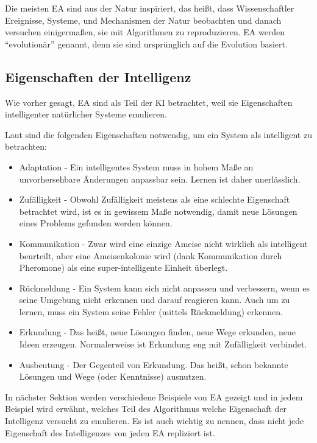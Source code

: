 \documentclass[twoside,twocolumn]{article}
\begin{document}
Die meisten EA sind aus der Natur inspiriert, das heißt, dass Wissenschaftler Ereignisse, Systeme, und Mechanismen der Natur beobachten und danach versuchen einigermaßen, sie mit Algorithmen zu reproduzieren. EA werden \enquote{evolutionär} genannt, denn sie sind ursprünglich auf die Evolution basiert. \cite{holland_ga}

\subsection{Eigenschaften der Intelligenz}
Wie vorher gesagt, EA sind als Teil der KI betrachtet, weil sie Eigenschaften intelligenter natürlicher Systeme emulieren.\par
Laut \cite{wiley_evolutionary} sind die folgenden Eigenschaften notwendig, um ein System als intelligent zu betrachten:

\begin{itemize}
\item{Adaptation - Ein intelligentes System muss in hohem Maße an unvorhersehbare Änderungen anpassbar sein. Lernen ist daher unerlässlich.}
\item{Zufälligkeit - Obwohl Zufälligkeit meistens als eine schlechte Eigenschaft betrachtet wird, ist es in gewissem Maße notwendig, damit neue Lösungen eines Problems gefunden werden können.}
\item{Kommunikation -  Zwar wird eine einzige Ameise nicht wirklich als intelligent beurteilt, aber eine Ameisenkolonie wird (dank Kommunikation durch Pheromone) als eine super-intelligente Einheit überlegt.}
\item{Rückmeldung - Ein System kann sich nicht anpassen und verbessern, wenn es seine Umgebung nicht erkennen und darauf reagieren kann. Auch um zu lernen, muss ein System seine Fehler (mittels Rückmeldung) erkennen.}
\item{Erkundung - Das heißt, neue Lösungen finden, neue Wege erkunden, neue Ideen erzeugen. Normalerweise ist Erkundung eng mit Zufälligkeit verbindet.}
\item{Ausbeutung - Der Gegenteil von Erkundung. Das heißt, schon bekannte Lösungen und Wege (oder Kenntnisse) ausnutzen.}
\end{itemize}

In nächster Sektion werden verschiedene Beispiele von EA gezeigt und in jedem Beispiel wird erwähnt, welches Teil des Algorithmus welche Eigenschaft der Intelligenz versucht zu emulieren. Es ist auch wichtig zu nennen, dass nicht jede Eigenschaft des Intelligenzes von jeden EA repliziert ist.
\end{document}
